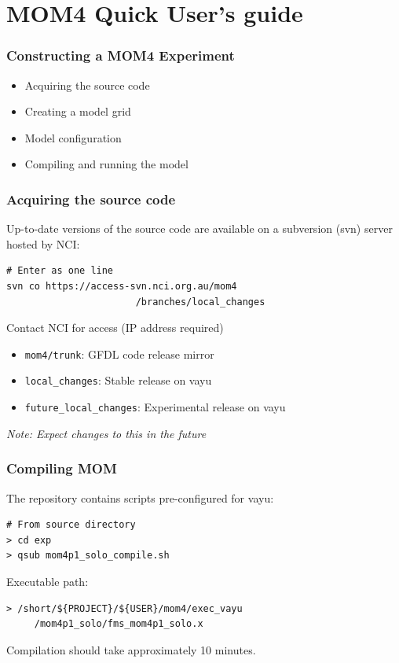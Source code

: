 \documentclass[red]{beamer}
\begin{document}
\section{MOM4 Quick User's guide}
\begin{frame}
    \frametitle{Constructing a MOM4 Experiment}
    
    \begin{itemize}
        \item Acquiring the source code
        \item Creating a model grid
        \item Model configuration
        \item Compiling and running the model
    \end{itemize}

\end{frame}

\begin{frame}[fragile]
    \frametitle{Acquiring the source code}
    
    Up-to-date versions of the source code are available on a subversion (svn)
    server hosted by NCI:
    
    \begin{lstlisting}
# Enter as one line
svn co https://access-svn.nci.org.au/mom4
                       /branches/local_changes
    \end{lstlisting}
    Contact NCI for access (IP address required)
    
    \begin{itemize}
        \item \lstinline|mom4/trunk|: GFDL code release mirror
        \item \lstinline|local_changes|: Stable release on vayu
        \item \lstinline|future_local_changes|: Experimental release on vayu
    \end{itemize}
    
    \textit{Note: Expect changes to this in the future}
\end{frame}

\begin{frame}[fragile]
    \frametitle{Compiling MOM}
    
    The repository contains scripts pre-configured for vayu:
    \begin{lstlisting}
# From source directory
> cd exp
> qsub mom4p1_solo_compile.sh
    \end{lstlisting}
    
    Executable path:
    \begin{lstlisting}
> /short/${PROJECT}/${USER}/mom4/exec_vayu
     /mom4p1_solo/fms_mom4p1_solo.x
    \end{lstlisting}
    
    Compilation should take approximately 10 minutes. 
\end{frame}
\end{document}

